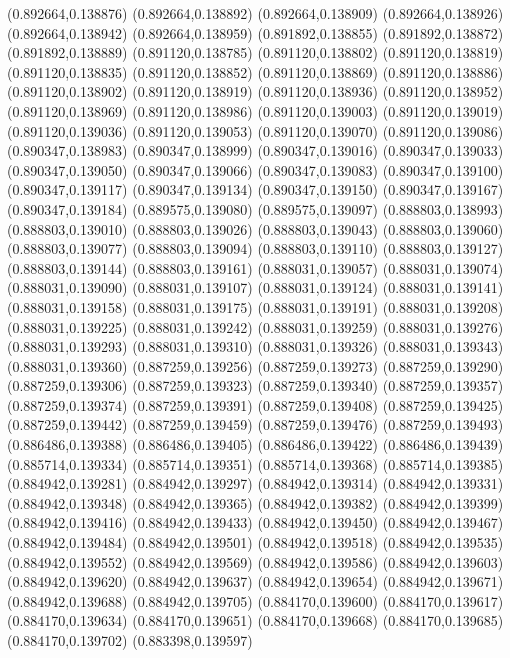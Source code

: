 (0.892664,0.138876)
(0.892664,0.138892)
(0.892664,0.138909)
(0.892664,0.138926)
(0.892664,0.138942)
(0.892664,0.138959)
(0.891892,0.138855)
(0.891892,0.138872)
(0.891892,0.138889)
(0.891120,0.138785)
(0.891120,0.138802)
(0.891120,0.138819)
(0.891120,0.138835)
(0.891120,0.138852)
(0.891120,0.138869)
(0.891120,0.138886)
(0.891120,0.138902)
(0.891120,0.138919)
(0.891120,0.138936)
(0.891120,0.138952)
(0.891120,0.138969)
(0.891120,0.138986)
(0.891120,0.139003)
(0.891120,0.139019)
(0.891120,0.139036)
(0.891120,0.139053)
(0.891120,0.139070)
(0.891120,0.139086)
(0.890347,0.138983)
(0.890347,0.138999)
(0.890347,0.139016)
(0.890347,0.139033)
(0.890347,0.139050)
(0.890347,0.139066)
(0.890347,0.139083)
(0.890347,0.139100)
(0.890347,0.139117)
(0.890347,0.139134)
(0.890347,0.139150)
(0.890347,0.139167)
(0.890347,0.139184)
(0.889575,0.139080)
(0.889575,0.139097)
(0.888803,0.138993)
(0.888803,0.139010)
(0.888803,0.139026)
(0.888803,0.139043)
(0.888803,0.139060)
(0.888803,0.139077)
(0.888803,0.139094)
(0.888803,0.139110)
(0.888803,0.139127)
(0.888803,0.139144)
(0.888803,0.139161)
(0.888031,0.139057)
(0.888031,0.139074)
(0.888031,0.139090)
(0.888031,0.139107)
(0.888031,0.139124)
(0.888031,0.139141)
(0.888031,0.139158)
(0.888031,0.139175)
(0.888031,0.139191)
(0.888031,0.139208)
(0.888031,0.139225)
(0.888031,0.139242)
(0.888031,0.139259)
(0.888031,0.139276)
(0.888031,0.139293)
(0.888031,0.139310)
(0.888031,0.139326)
(0.888031,0.139343)
(0.888031,0.139360)
(0.887259,0.139256)
(0.887259,0.139273)
(0.887259,0.139290)
(0.887259,0.139306)
(0.887259,0.139323)
(0.887259,0.139340)
(0.887259,0.139357)
(0.887259,0.139374)
(0.887259,0.139391)
(0.887259,0.139408)
(0.887259,0.139425)
(0.887259,0.139442)
(0.887259,0.139459)
(0.887259,0.139476)
(0.887259,0.139493)
(0.886486,0.139388)
(0.886486,0.139405)
(0.886486,0.139422)
(0.886486,0.139439)
(0.885714,0.139334)
(0.885714,0.139351)
(0.885714,0.139368)
(0.885714,0.139385)
(0.884942,0.139281)
(0.884942,0.139297)
(0.884942,0.139314)
(0.884942,0.139331)
(0.884942,0.139348)
(0.884942,0.139365)
(0.884942,0.139382)
(0.884942,0.139399)
(0.884942,0.139416)
(0.884942,0.139433)
(0.884942,0.139450)
(0.884942,0.139467)
(0.884942,0.139484)
(0.884942,0.139501)
(0.884942,0.139518)
(0.884942,0.139535)
(0.884942,0.139552)
(0.884942,0.139569)
(0.884942,0.139586)
(0.884942,0.139603)
(0.884942,0.139620)
(0.884942,0.139637)
(0.884942,0.139654)
(0.884942,0.139671)
(0.884942,0.139688)
(0.884942,0.139705)
(0.884170,0.139600)
(0.884170,0.139617)
(0.884170,0.139634)
(0.884170,0.139651)
(0.884170,0.139668)
(0.884170,0.139685)
(0.884170,0.139702)
(0.883398,0.139597)
